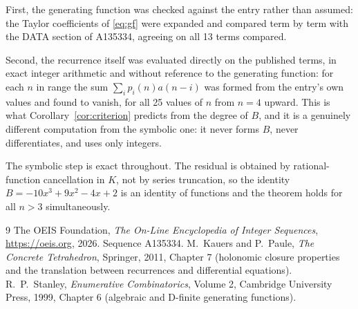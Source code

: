 \documentclass[11pt,a4paper]{article}
\theoremstyle{plain}
\theoremstyle{definition}
\begin{document}
First, the generating function was checked against the entry rather than assumed: the
Taylor coefficients of \eqref{eq:gf} were expanded and compared term by term with the DATA
section of A135334, agreeing on all 13 terms compared.

Second, the recurrence itself was evaluated directly on the published terms, in exact
integer arithmetic and without reference to the generating function: for each $n$ in range
the sum $\sum_{i}p_{i}(n)a(n-i)$ was formed from the entry's own values and found to
vanish, for all 25 values of $n$ from $n=4$ upward. This is what
Corollary~\ref{cor:criterion} predicts from the degree of $B$, and it is a genuinely
different computation from the symbolic one: it never forms $B$, never differentiates, and
uses only integers.

The symbolic step is exact throughout. The residual is obtained by rational-function
cancellation in $K$, not by series truncation, so the identity $B=- 10 x^{3} + 9 x^{2} - 4 x + 2$ is an
identity of functions and the theorem holds for all $n>3$ simultaneously.

\begin{thebibliography}{9}
 The OEIS Foundation, \emph{The On-Line Encyclopedia of Integer Sequences},
\url{https://oeis.org}, 2026. Sequence A135334.
 M.~Kauers and P.~Paule, \emph{The Concrete Tetrahedron}, Springer, 2011,
Chapter 7 (holonomic closure properties and the translation between recurrences and
differential equations).
 R.~P.~Stanley, \emph{Enumerative Combinatorics}, Volume 2, Cambridge
University Press, 1999, Chapter 6 (algebraic and D-finite generating functions).
\end{thebibliography}
\end{document}
